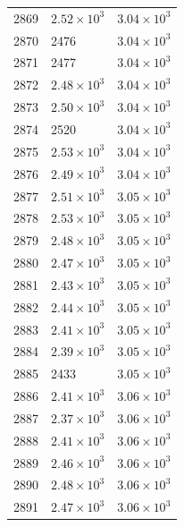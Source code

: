 \begin{table}[H]
\begin{tabular}{lll}
2869 & $\displaystyle 2.52 \times 10^{3}$ & $\displaystyle 3.04 \times 10^{3}$ \\
2870 & 2476 & $\displaystyle 3.04 \times 10^{3}$ \\
2871 & 2477 & $\displaystyle 3.04 \times 10^{3}$ \\
2872 & $\displaystyle 2.48 \times 10^{3}$ & $\displaystyle 3.04 \times 10^{3}$ \\
2873 & $\displaystyle 2.50 \times 10^{3}$ & $\displaystyle 3.04 \times 10^{3}$ \\
2874 & 2520 & $\displaystyle 3.04 \times 10^{3}$ \\
2875 & $\displaystyle 2.53 \times 10^{3}$ & $\displaystyle 3.04 \times 10^{3}$ \\
2876 & $\displaystyle 2.49 \times 10^{3}$ & $\displaystyle 3.04 \times 10^{3}$ \\
2877 & $\displaystyle 2.51 \times 10^{3}$ & $\displaystyle 3.05 \times 10^{3}$ \\
2878 & $\displaystyle 2.53 \times 10^{3}$ & $\displaystyle 3.05 \times 10^{3}$ \\
2879 & $\displaystyle 2.48 \times 10^{3}$ & $\displaystyle 3.05 \times 10^{3}$ \\
2880 & $\displaystyle 2.47 \times 10^{3}$ & $\displaystyle 3.05 \times 10^{3}$ \\
2881 & $\displaystyle 2.43 \times 10^{3}$ & $\displaystyle 3.05 \times 10^{3}$ \\
2882 & $\displaystyle 2.44 \times 10^{3}$ & $\displaystyle 3.05 \times 10^{3}$ \\
2883 & $\displaystyle 2.41 \times 10^{3}$ & $\displaystyle 3.05 \times 10^{3}$ \\
2884 & $\displaystyle 2.39 \times 10^{3}$ & $\displaystyle 3.05 \times 10^{3}$ \\
2885 & 2433 & $\displaystyle 3.05 \times 10^{3}$ \\
2886 & $\displaystyle 2.41 \times 10^{3}$ & $\displaystyle 3.06 \times 10^{3}$ \\
2887 & $\displaystyle 2.37 \times 10^{3}$ & $\displaystyle 3.06 \times 10^{3}$ \\
2888 & $\displaystyle 2.41 \times 10^{3}$ & $\displaystyle 3.06 \times 10^{3}$ \\
2889 & $\displaystyle 2.46 \times 10^{3}$ & $\displaystyle 3.06 \times 10^{3}$ \\
2890 & $\displaystyle 2.48 \times 10^{3}$ & $\displaystyle 3.06 \times 10^{3}$ \\
2891 & $\displaystyle 2.47 \times 10^{3}$ & $\displaystyle 3.06 \times 10^{3}$ \\

\end{tabular}
\end{table}
